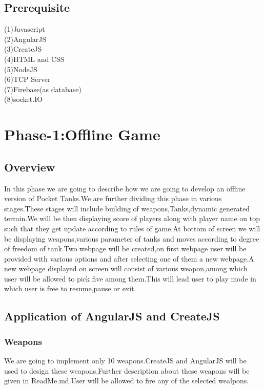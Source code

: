 \documentclass{scrreprt}
\begin{document}
\section{Prerequisite}
(1)Javascript \\
(2)AngularJS\\
(3)CreateJS\\
(4)HTML and CSS\\
(5)NodeJS\\
(6)TCP Server\\
(7)Firebase(as database)\\
(8)socket.IO\\



\chapter{Phase-1:Offline Game}
\section{Overview}
In this phase we are going to describe how we are going to develop an offline version of Pocket Tanks.We are further dividing this phase in various stages.These stages will include building of weapons,Tanks,dynamic generated terrain.We will be then displaying score of players along with player name on top such that they get update according to rules of game.At bottom of screen we will be displaying weapons,various parameter of tanks  
and moves according to degree of freedom of tank.Two webpage will be created,on first webpage user will be provided with various options and after selecting one of them a new webpage.A new webpage displayed on screen will consist of various weapon,among which user will be allowed to pick five among them.This will lead user to play mode in which user is free to resume,pause or exit.\\
\section{Application of AngularJS and CreateJS}
\subsection{Weapons}
We are going to implement only 10 weapons.CreateJS and AngularJS will be used to design these weapons.Further description about these weapons will be given in ReadMe.md.User will be allowed to fire any of the selected wealpons.\\
\end{document}
